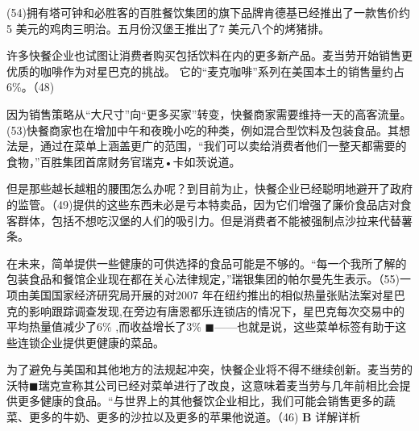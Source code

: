 \documentclass[UTF8,11pt]{ctexart}
\begin{document}
(54)拥有塔可钟和必胜客的百胜餐饮集团的旗下品牌肯德基已经推出了一款售价约5 美元的鸡肉三明治。五月份汉堡王推出了7 美元八个的烤猪排。


许多快餐企业也试图让消费者购买包括饮料在内的更多新产品。麦当劳开始销售更优质的咖啡作为对星巴克的挑战。 它的“麦克咖啡”系列在美国本土的销售量约占6\%。（48) 


因为销售策略从“大尺寸”向“更多买家”转变，快餐商家需要维持一天的高客流量。(53)快餐商家也在增加中午和夜晚小吃的种类，例如混合型饮料及包装食品。其想法是，通过在菜单上涵盖更广的范围，“我们可以卖给消费者他们一整天都需要的食物，”百胜集团首席财务官瑞克•卡如茨说道。


但是那些越长越粗的腰围怎么办呢？到目前为止，快餐企业已经聪明地避开了政府的监管。（49)提供的这些东西未必是亏本特卖品，因为它们增强了廉价食品店对食客群体，包括不想吃汉堡的人们的吸引力。但是消费者不能被强制点沙拉来代替薯条。


在未来，简单提供一些健康的可供选择的食品可能是不够的。“每一个我所了解的包装食品和餐馆企业现在都在关心法律规定，”瑞银集团的帕尔曼先生表示。（55)一项由美国国家经济研究局开展的对2007 年在纽约推出的相似热量张贴法案对星巴克的影响跟踪调查发现,在旁边有唐恩都乐连锁店的情况下，星巴克每次交易中的平均热量值减少了6\% ,而收益增长了3\% \(\blacksquare\)——也就是说，这些菜单标签有助于这些连锁企业提供更健康的菜品。


为了避免与美国和其他地方的法规起冲突，快餐企业将不得不继续创新。麦当劳的沃特\(\blacksquare\)瑞克宣称其公司已经对菜单进行了改良，这意味着麦当劳与几年前相比会提供更多健康的食品。“与世界上的其他餐饮企业相比，我们可能会销售更多的蔬菜、更多的牛奶、更多的沙拉以及更多的苹果他说道。（46) \textbf{B} 详解详析
\end{document}

